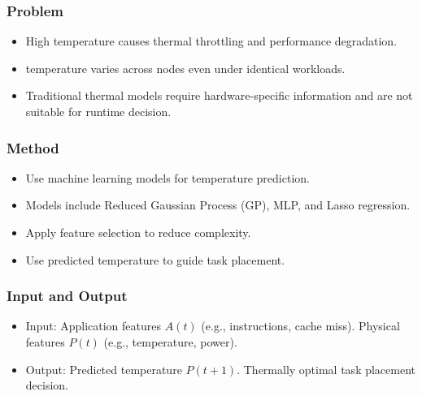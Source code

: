 \documentclass[12pt,a4paper]{article}
\begin{document}
    \subsubsection{Problem}
    
                   \begin{itemize}
                   
                        \item  High temperature causes thermal throttling and performance degradation.
                        \item temperature varies across nodes even under identical workloads.
                        \item Traditional thermal models require hardware-specific information and are not suitable for runtime decision.
                    \end{itemize}
                    
    \subsubsection{Method}

                \begin{itemize}
                   \item Use machine learning models for temperature prediction.
                    \item Models include Reduced Gaussian Process (GP), MLP, and Lasso regression.
                    \item Apply feature selection to reduce complexity.
                    \item Use predicted temperature to guide task placement.
                \end{itemize}
                
    \subsubsection{Input and Output}

                \begin{itemize}
                   \item Input:
                        Application features $A(t)$ (e.g., instructions, cache miss).
                        Physical features $P(t)$ (e.g., temperature, power).
                 \end{itemize}  

                 \begin{itemize}
                   \item Output:
                    Predicted temperature $P(t+1)$.
                    Thermally optimal task placement decision.
                 \end{itemize}
                 
\end{document}
